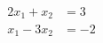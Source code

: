 \documentclass[preview]{standalone}
\begin{document}
\begin{align*} 
2x_1 + x_2 &=  3 \\ 
x_1 - 3x_2 &= -2 
\end{align*}
\end{document}
